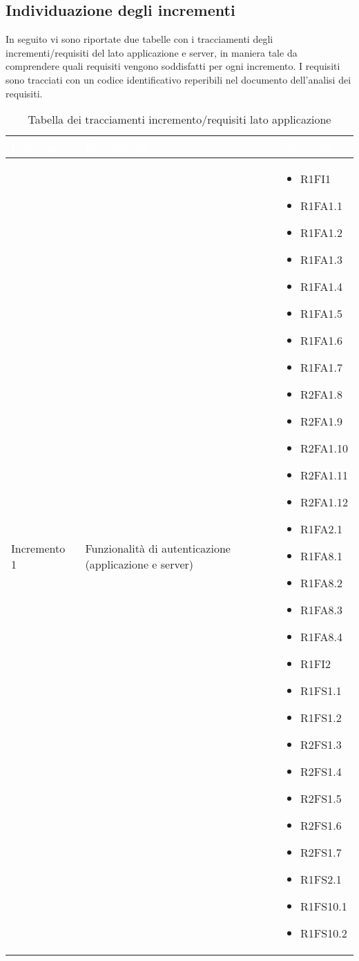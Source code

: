\subsection{Individuazione degli incrementi}
In seguito vi sono riportate due tabelle con i tracciamenti degli incrementi/requisiti del lato applicazione e server, in maniera tale da comprendere quali requisiti vengono soddisfatti per ogni incremento.
I requisiti sono tracciati con un codice identificativo reperibili nel documento dell'analisi dei requisiti.

{
\renewcommand{\arraystretch}{2}
\centering
	
\begin{longtable}{C{4cm} C{6cm} C{4cm}}
\caption{Tabella dei tracciamenti incremento/requisiti lato applicazione}\\

\textcolor{white}{\textbf{Incremento}} &
\textcolor{white}{\textbf{Descrizione}} & 
\textcolor{white}{\textbf{Requisiti}}\\
\endhead

Incremento 1 & Funzionalità di autenticazione (applicazione e server) & \begin{itemize}
    \item[ ] R1FI1
    \item[ ] R1FA1.1
    \item[ ] R1FA1.2
    \item[ ] R1FA1.3
    \item[ ] R1FA1.4
    \item[ ] R1FA1.5
    \item[ ] R1FA1.6
    \item[ ] R1FA1.7
    \item[ ] R2FA1.8
    \item[ ] R2FA1.9
    \item[ ] R2FA1.10
    \item[ ] R2FA1.11
    \item[ ] R2FA1.12 
    \item[ ] R1FA2.1
    \item[ ] R1FA8.1
    \item[ ] R1FA8.2
    \item[ ] R1FA8.3
    \item[ ] R1FA8.4
    \item[ ] R1FI2
    \item[ ] R1FS1.1
    \item[ ] R1FS1.2
    \item[ ] R2FS1.3
    \item[ ] R2FS1.4
    \item[ ] R2FS1.5
    \item[ ] R2FS1.6
    \item[ ] R2FS1.7
    \item[ ] R1FS2.1
    \item[ ] R1FS10.1
    \item[ ] R1FS10.2
\end{itemize}\\


\end{longtable}}
